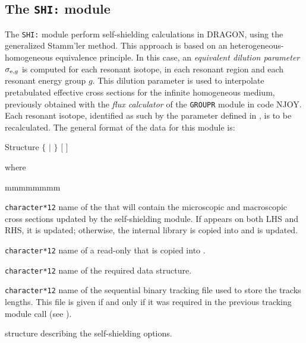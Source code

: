 \subsection{The {\tt SHI:} module}\label{sect:SHIData}

The {\tt SHI:} module perform self-shielding calculations in DRAGON, using
the generalized Stamm'ler method.\cite{SHIBA}  This approach is based on an heterogeneous-homogeneous equivalence principle. In this case, an {\sl equivalent dilution parameter} $\sigma_{{\rm e},g}$ is computed for each resonant isotope, in each resonant region and
each resonant energy group $g$. This dilution parameter is used to interpolate pretabulated effective cross sections for the infinite homogeneous medium, previously obtained with the {\sl flux calculator} of the {\tt GROUPR} module in code NJOY.\cite{njoy2010}
Each resonant isotope, identified as such by the 
parameter defined in , is to be recalculated. The general format of
the data for this module is:

\begin{DataStructure}{Structure }
 \moc{:=}  $\{$  $|$  $\}$ 
 $[$  $]$ \moc{::} 
\end{DataStructure}

\noindent
where

\begin{ListeDeDescription}{mmmmmmmm}

\item[\dusa{MICLIB}] {\tt character*12} name of the  that will
contain the microscopic and macroscopic cross sections updated by the
self-shielding module. If
 appears on both LHS and RHS, it is updated; otherwise, the
internal library  is copied into
 and  is updated.

\item[\dusa{OLDLIB}] {\tt character*12} name of a read-only  
that is copied into .

\item[\dusa{TRKNAM}] {\tt character*12} name of the required 
data structure.

\item[\dusa{TRKFIL}] {\tt character*12} name of the sequential binary tracking
file used to store the tracks lengths. This file is given if and only if it was
required in the previous tracking module call (see ).

\item[\dstr{descshi}] structure describing the self-shielding options.

\end{ListeDeDescription}

